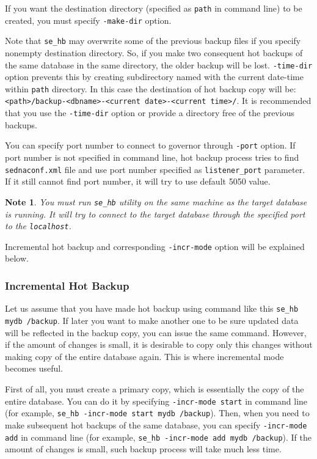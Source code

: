 \documentclass[a4paper,12pt]{article}
\newtheorem{note}{Note}    %
\begin{document}
If you want the destination directory (specified as \verb!path! in command line)
to be created, you must specify \verb!-make-dir! option.

Note that \verb!se_hb! may overwrite some of the previous backup files if you
specify nonempty destination directory. So, if you make two consequent hot
backups of the same database in the same directory, the older backup will be
lost. \verb!-time-dir! option prevents this by creating subdirectory named with
the current date-time within \verb!path! directory. In this case the destination
of hot backup copy will be:
\verb!<path>/backup-<dbname>-<current date>-<current time>/!.
It is recommended that you use the \verb!-time-dir! option or provide a
directory free of the previous backups.

You can specify port number to connect to governor through \verb!-port! option.
If port number is not specified in command line, hot backup process tries to
find \verb!sednaconf.xml! file and use port number specified as
\verb!listener_port! parameter. If it still cannot find port number, it will try
to use default 5050 value.

\begin{note}
You must run \verb!se_hb! utility on the same machine as the target database is
running. It will try to connect to the target database through the specified
port to the \verb!localhost!.
\end{note}

Incremental hot backup and corresponding \verb!-incr-mode! option will be
explained below.


\subsubsection*{Incremental Hot Backup}

Let us assume that you have made hot backup using command like this
\verb!se_hb mydb /backup!. If later you want to make another one to be sure
updated data will be reflected in the backup copy, you can issue the same
command. However, if the amount of changes is small, it is desirable to copy
only this changes without making copy of the entire database again. This is
where incremental mode becomes useful.

First of all, you must create a primary copy, which is essentially the copy of
the entire database. You can do it by specifying \verb!-incr-mode start! in
command line (for example, \verb!se_hb -incr-mode start mydb /backup!). Then,
when you need to make subsequent hot backups of the same database, you can
specify \verb!-incr-mode add! in command line (for example,
\verb!se_hb -incr-mode add mydb /backup!). If the amount of changes is small,
such backup process will take much less time.
\end{document}
